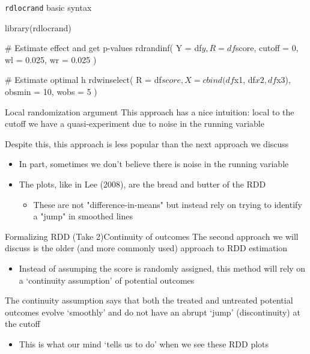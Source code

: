 \documentclass[aspectratio=169,t,11pt,table]{beamer}
\begin{document}
\begin{frame}[fragile]{\texttt{rdlocrand} basic syntax}
  \vspace*{-\medskipamount}
  \begin{codeblock}
library(rdlocrand)

# Estimate effect and get p-values
rdrandinf(
  Y = df$y, R = df$score, cutoff = 0, wl = 0.025, wr = 0.025
)

# Estimate optimal h
rdwinselect(
  R = df$score, X = cbind(df$x1, df$x2, df$x3), obsmin = 10, wobs = 5
)
  \end{codeblock}  
\end{frame} 

\begin{frame}{Local randomization argument}
  This approach has a nice intuition: local to the cutoff we have a quasi-experiment due to noise in the running variable

  \bigskip
  Despite this, this approach is less popular than the next approach we discuss
  \begin{itemize}
    \item In part, sometimes we don't believe there is noise in the running variable
    
    \item The plots, like in Lee (2008), are the bread and butter of the RDD
    \begin{itemize}
      \item These are not "difference-in-means" but instead rely on trying to identify a "jump" in smoothed lines
    \end{itemize} 
  \end{itemize}
\end{frame}

\begin{frame}{Formalizing RDD (Take 2)}{Continuity of outcomes}
  The second approach we will discuss is the older (and more commonly used) approach to RDD estimation
  \begin{itemize}
    \item Instead of assumping the score is randomly assigned, this method will rely on a `continuity assumption' of potential outcomes
  \end{itemize}

  \pause
  \bigskip
  The \alert{continuity assumption} says that both the treated and untreated potential outcomes evolve `smoothly' and do not have an abrupt `jump' (discontinuity) at the cutoff
  \begin{itemize}
    \item This is what our mind `tells us to do' when we see these RDD plots
  \end{itemize}
\end{frame}
\end{document}
